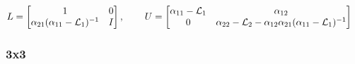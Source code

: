 \documentclass[a4paper,10pt]{article}
\begin{document}
\begin{align*}
L & = \begin{bmatrix}
	1 & 0 \\
	\alpha_{21} (\alpha_{11} - \mathcal{L}_1)^{-1} & I
\end{bmatrix}
,\hspace{5ex}
U = \begin{bmatrix}
	\alpha_{11} - \mathcal{L}_1 & \alpha_{12} \\
	0 & \alpha_{22} - \mathcal{L}_2 - \alpha_{12} \alpha_{21} (\alpha_{11} - \mathcal{L}_1)^{-1}
\end{bmatrix}
\end{align*}


\subsubsection{3x3}
\end{document}

